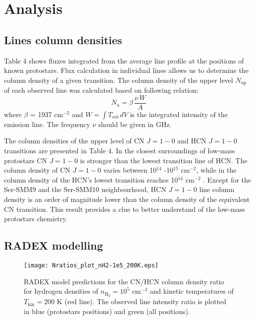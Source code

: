 \documentclass{aa}
\begin{document}
\section{Analysis}

\subsection{Lines column densities}

Table 4 shows fluxes integrated from the average line profile at the positions of known protostars. 
Flux calculation in individual lines allows us to determine the column density of a given transition. The column density of the upper level $N_\mathrm{up}$ of each observed line was calculated based on following relation:
\begin{equation} \label{eq1}
N_u = \beta \, \frac{\nu \, W}{A}
\end{equation}
where $\beta$ = 1937 cm$^{-2}$ and $W = \int{T_{mb} \, dV}$ is the integrated intensity of the emission line. The frequency $\nu$ should be given in GHz.

The column densities of the upper level of CN $J=1-0$ and HCN $J=1-0$ transitions are presented in Table 4. In the closest surroundings of low-mass protostars CN $J=1-0$ is stronger than the lowest transition line of HCN. The column density of CN $J=1-0$ varies between 10$^{14}$ -10$^{15}$ cm$^{-2}$, while in the column density of the HCN’s lowest transition reaches 10$^{14}$ cm$^{-2}$ . Except for the Ser-SMM9 and the Ser-SMM10 neighbourhood, HCN $J=1-0$ line column density is an order of magnitude lower than the column density of the equivalent CN transition. This result provides a clue to better understand of the low-mass protostars chemistry.  

\subsection{RADEX modelling}

\begin{figure}
   \centering
   \texttt{[image: Nratios\_plot\_nH2-1e5\_200K.eps]}
      \caption{RADEX model predictions for the CN/HCN column density ratio for hydrogen densities of $n_\mathrm{H_2} = 10^5$ cm$^{-3}$ and kinetic temperatures of $T_\mathrm{kin} = 200$ K (red line). The observed line intensity ratio is plotted in blue (protostars positions) and green (all positions).}
         \label{1e5_75K}
   \end{figure}
\end{document}
